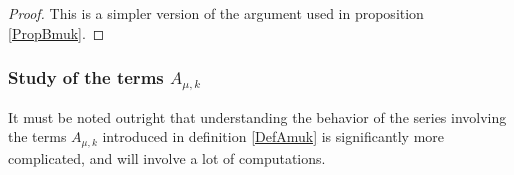 \documentclass{jams-l}
\theoremstyle{definition}
\theoremstyle{remark}
\numberwithin{equation}{section}
\begin{document}
            \begin{proof}
        
                This is a simpler version of the argument used in proposition \ref{PropBmuk}.
        
            \end{proof}
        
        
        \subsubsection{Study of the terms $A_{\mu,k}$}
        \label{SubSubSecStudyAmuk}
            
            It must be noted outright that understanding the behavior of the series involving the terms $A_{\mu,k}$ introduced in definition \ref{DefAmuk} is significantly more complicated, and will involve a lot of computations.
            
\end{document}

